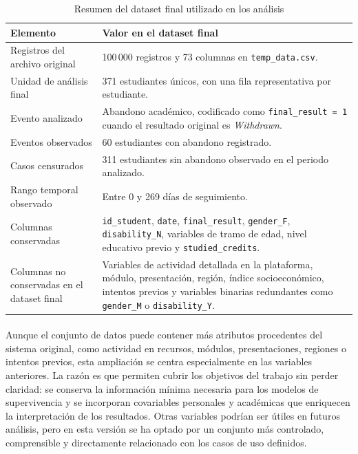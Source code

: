\begin{table}[H]
\centering
\small
\begin{tabularx}{\textwidth}{|p{}|X|}
\hline
\textbf{Elemento} & \textbf{Valor en el dataset final} \\ \hline
Registros del archivo original & 100\,000 registros y 73 columnas en \texttt{temp\_data.csv}. \\ \hline
Unidad de análisis final & 371 estudiantes únicos, con una fila representativa por estudiante. \\ \hline
Evento analizado & Abandono académico, codificado como \texttt{final\_result = 1} cuando el resultado original es \textit{Withdrawn}. \\ \hline
Eventos observados & 60 estudiantes con abandono registrado. \\ \hline
Casos censurados & 311 estudiantes sin abandono observado en el periodo analizado. \\ \hline
Rango temporal observado & Entre 0 y 269 días de seguimiento. \\ \hline
Columnas conservadas & \texttt{id\_student}, \texttt{date}, \texttt{final\_result}, \texttt{gender\_F}, \texttt{disability\_N}, variables de tramo de edad, nivel educativo previo y \texttt{studied\_credits}. \\ \hline
Columnas no conservadas en el dataset final & Variables de actividad detallada en la plataforma, módulo, presentación, región, índice socioeconómico, intentos previos y variables binarias redundantes como \texttt{gender\_M} o \texttt{disability\_Y}. \\ \hline
\end{tabularx}
\caption{Resumen del dataset final utilizado en los análisis}
\label{tab:resumen_dataset_final}
\normalsize
\end{table}

\paragraph*{}Aunque el conjunto de datos puede contener más atributos procedentes del sistema original, como actividad en recursos, módulos, presentaciones, regiones o intentos previos, esta ampliación se centra especialmente en las variables anteriores. La razón es que permiten cubrir los objetivos del trabajo sin perder claridad: se conserva la información mínima necesaria para los modelos de supervivencia y se incorporan covariables personales y académicas que enriquecen la interpretación de los resultados. Otras variables podrían ser útiles en futuros análisis, pero en esta versión se ha optado por un conjunto más controlado, comprensible y directamente relacionado con los casos de uso definidos.

